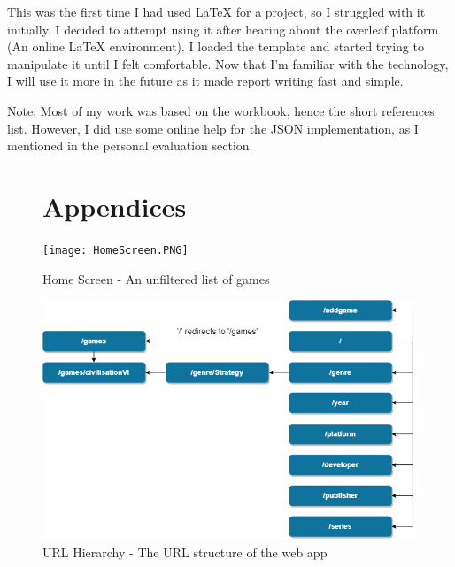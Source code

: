 \documentclass[10pt, a4paper]{article}
\begin{document}
	This was the first time I had used LaTeX for a project, so I struggled with it initially. I decided to attempt using it after hearing about the overleaf platform (An online LaTeX environment). I loaded the template and started trying to manipulate it until I felt comfortable. Now that I'm familiar with the technology, I will use it more in the future as it made report writing fast and simple.
	


Note: Most of my work was based on the workbook, hence the short references list. However, I did use some online help for the JSON implementation, as I mentioned in the personal evaluation section.

\begin{figure}
\section{Appendices}
\end{figure}


\begin{figure}
\texttt{[image: HomeScreen.PNG]}
\caption[width=\textwidth]{Home Screen - An unfiltered list of games} \label{homeScreen}
\end{figure}

\begin{figure}
\includegraphics[width=\textwidth]{URLHierarchy.png}
\caption[width=\textwidth]{URL Hierarchy - The URL structure of the web app} \label{URLHierarchy}
\end{figure}
		
\end{document}
